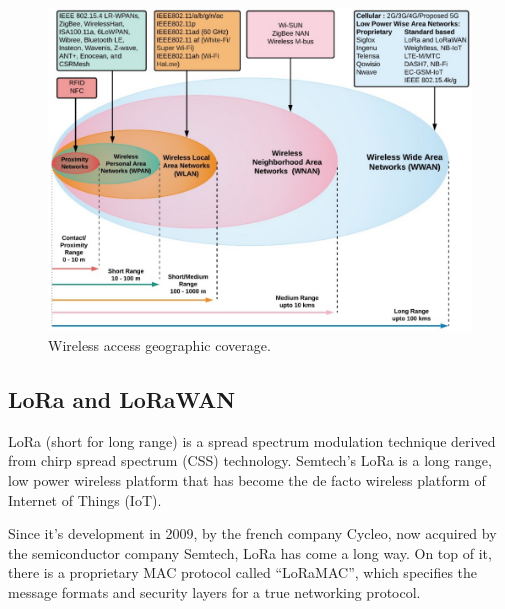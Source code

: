 	
	\begin{figure}
		\centering
		\includegraphics[width=\textheight,height=\textwidth,keepaspectratio,angle=90]{resources/img/iot_range}
		\caption[Wireless access geographic coverage.]{Wireless access geographic coverage. \cite{fi12030046}}
		\label{img:wireless_coverage}
	\end{figure}

	\subsection{LoRa and LoRaWAN}\label{subsec:lora_lorawan}
	
		LoRa (short for long range) is a spread spectrum modulation technique derived from chirp spread spectrum (CSS) technology.
		Semtech’s LoRa is a long range, low power wireless platform that has become the de facto wireless platform of Internet of Things (IoT).
		
		Since it's development in 2009, by the french company Cycleo, now acquired by the semiconductor company Semtech, LoRa has come a long way.				
		On top of it, there is a proprietary MAC protocol called “LoRaMAC”, which specifies the message formats and security layers for a true networking protocol.
		

